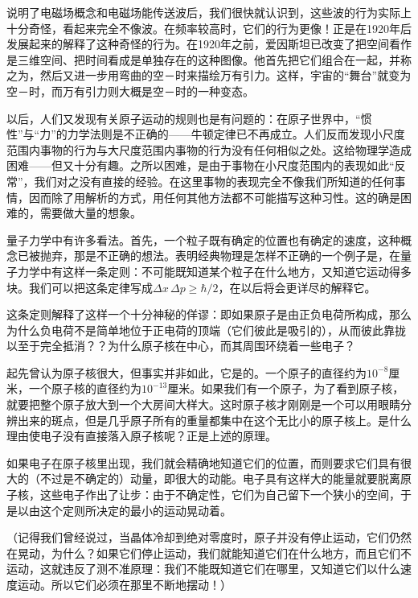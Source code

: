  说明了电磁场概念和电磁场能传送波后，我们很快就认识到，这些波的行为实际上十分奇怪，看起来完全不像波。在频率较高时，它们的行为更像！正是在1920年后发展起来的解释了这种奇怪的行为。在1920年之前，爱因斯坦已改变了把空间看作是三维空间、把时间看成是单独存在的这种图像。他首先把它们组合在一起，并称之为，然后又进一步用弯曲的空－时来描绘万有引力。这样，宇宙的“舞台”就变为空－时，而万有引力则大概是空－时的一种变态。

以后，人们又发现有关原子运动的规则也是有问题的：在原子世界中，“惯性”与“力”的力学法则是不正确的——牛顿定律已不再成立。人们反而发现小尺度范围内事物的行为与大尺度范围内事物的行为没有任何相似之处。这给物理学造成困难——但又十分有趣。之所以困难，是由于事物在小尺度范围内的表现如此“反常”，我们对之没有直接的经验。在这里事物的表现完全不像我们所知道的任何事情，因而除了用解析的方式，用任何其他方法都不可能描写这种习性。这的确是困难的，需要做大量的想象。

 量子力学中有许多看法。首先，一个粒子既有确定的位置也有确定的速度，这种概念已被抛弃，那是不正确的想法。表明经典物理是怎样不正确的一个例子是，在量子力学中有这样一条定则：不可能既知道某个粒子在什么地方，又知道它运动得多块。我们可以把这条定律写成$ \Delta x\,\Delta p\geq\hbar/2 $，在以后将会更详尽的解释它。

这条定则解释了这样一个十分神秘的佯谬：即如果原子是由正负电荷所构成，那么为什么负电荷不是简单地位于正电荷的顶端（它们彼此是吸引的），从而彼此靠拢以至于完全抵消？？为什么原子核在中心，而其周围环绕着一些电子？

起先曾认为原子核很大，但事实并非如此，它是的。一个原子的直径约为$ 10^{-8} $厘米，一个原子核的直径约为$ 10^{-13} $厘米。如果我们有一个原子，为了看到原子核，就要把整个原子放大到一个大房间大样大。这时原子核才刚刚是一个可以用眼睛分辨出来的斑点，但是几乎原子所有的重量都集中在这个无比小的原子核上。是什么理由使电子没有直接落入原子核呢？正是上述的原理。

如果电子在原子核里出现，我们就会精确地知道它们的位置，而则要求它们具有很大的（不过是不确定的）动量，即很大的动能。电子具有这样大的能量就要脱离原子核，这些电子作出了让步：由于不确定性，它们为自己留下一个狭小的空间，于是以由这个定则所决定的最小的运动晃动着。

（记得我们曾经说过，当晶体冷却到绝对零度时，原子并没有停止运动，它们仍然在晃动，为什么？如果它们停止运动，我们就能知道它们在什么地方，而且它们不运动，这就违反了测不准原理：我们不能既知道它们在哪里，又知道它们以什么速度运动。所以它们必须在那里不断地摆动！）

